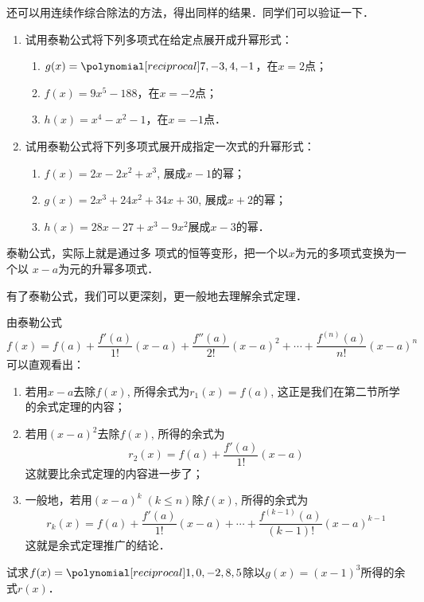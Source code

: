     还可以用连续作综合除法的方法，得出同样的结果．同学们可以验证一下．

\begin{ex}
\begin{enumerate}
    \item 试用泰勒公式将下列多项式在给定点展开成升幂形式：
\begin{enumerate}
    \item $g(x)=\poly{7,-3,4,-1}$，在$x=2$点；
    \item $f (x) =9x^5-188$，在$x=-2$点；
    \item $h(x)=x^4-x^2-1$，在$x=-1$点．
\end{enumerate}

    \item 试用泰勒公式将下列多项式展开成指定一次式的升幂形式：
\begin{enumerate}
    \item $f(x)=2x-2x^2+x^3$, 展成$x-1$的幂；
    \item $g(x)=2x^3+24x^2+34x+30$, 展成$x+2$的幂；
    \item $h(x)=28x-27+x^3-9x^2$展成$x-3$的幂．
\end{enumerate} 
\end{enumerate}
\end{ex}
    

泰勒公式，实际上就是通过多
项式的恒等变形，把一个以$x$为元的多项式变换为一个以
$x-a$为元的升幂多项式．

有了泰勒公式，我们可以更深刻，更一般地去理解余式定理．

由泰勒公式
\[f(x)=f(a)+\frac{f'(a)}{1!}(x-a)+\frac{f''(a)}{2!}(x-a)^2+\cdots+\frac{f^{(n)}(a)}{n!}(x-a)^n\]
可以直观看出：
\begin{enumerate}
    \item 若用$x-a$去除$f(x)$, 所得余式为$r_1(x)=f(a)$, 这正是我们在第二节所学的余式定理的内容；
    \item 若用$(x-a)^2$去除$f(x)$, 所得的余式为
    \[ r_2(x) =f (a) +\frac{f'(a)}{1!}  (x-a)\]
    这就要比余式定理的内容进一步了；
    \item 一般地，若用$(x-a)^k\; (k\le n)$除$f(x)$, 所得的余式为
    \[r_k(x)=f(a)+\frac{f'(a)}{1!}(x-a)+\cdots+\frac{f^{(k-1)}(a)}{(k-1)!}(x-a)^{k-1}\]
    这就是余式定理推广的结论．
\end{enumerate}

    \begin{example}
试求$f(x)=\poly{1,0,-2,8,5}$除以$g(x)=(x-1)^3$所得的余式$r(x)$．
    \end{example}    
    

